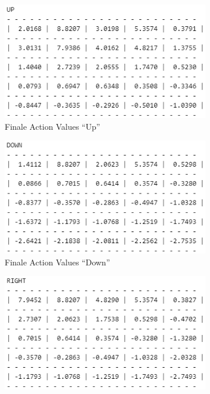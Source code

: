 \documentclass[11pt]{article}
\begin{document}
\begin{figure}
    \centering
    \begin{subfigure}[b]{0.49\textwidth}
        \centering
        \includegraphics[width=\textwidth]{img/img_2_1_b_up.png}
        \caption{Finale Action Values ``Up''}
        \label{img:2_1_b2_up}
    \end{subfigure}
    \hfill
    \begin{subfigure}[b]{0.49\textwidth}
        \centering
        \includegraphics[width=\textwidth]{img/img_2_1_b_down.png}
        \caption{Finale Action Values ``Down''}
        \label{img:2_1_b2_down}
    \end{subfigure}
    \hfill
    \begin{subfigure}[b]{0.49\textwidth}
        \centering
        \includegraphics[width=\textwidth]{img/img_2_1_b_right.png}

\end{subfigure}
\end{figure}
\end{document}
